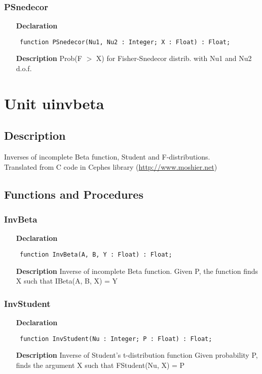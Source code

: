 \documentclass[12pt,a4paper,oneside]{report}
\newcommand{\declarationitem}[1]{\textbf{#1}}
\newcommand{\descriptiontitle}[1]{\textbf{#1}}
\newcommand{\code}[1]{\texttt{#1}}
\begin{document}
\subsubsection{PSnedecor}
\label{uibtdist-PSnedecor}
\begin{itemize}\item[\declarationitem{Declaration}\hfill]
	\begin{flushleft}
		\code{
			function PSnedecor(Nu1, Nu2 : Integer; X : Float) : Float;}
	\end{flushleft}
	\item[\descriptiontitle{Description}]
	Prob(F {$>$} X) for Fisher{-}Snedecor distrib. with Nu1 and Nu2 d.o.f.
\end{itemize}

\section{Unit uinvbeta}
\label{uinvbeta}
\subsection{Description}
Inverses of incomplete Beta function, Student and F{-}distributions.\\
Translated from C code in Cephes library (\href{http://www.moshier.net}{http://www.moshier.net}) \subsection{Functions and Procedures}
\subsubsection{InvBeta}
\label{uinvbeta-InvBeta}
\begin{itemize}\item[\declarationitem{Declaration}\hfill]
	\begin{flushleft}
		\code{
			function InvBeta(A, B, Y : Float) : Float;}
	\end{flushleft}
	\par
	\item[\descriptiontitle{Description}]
	Inverse of incomplete Beta function. Given P, the function finds X such that IBeta(A, B, X) = Y
\end{itemize}
\subsubsection{InvStudent}
\label{uinvbeta-InvStudent}
\begin{itemize}\item[\declarationitem{Declaration}\hfill]
	\begin{flushleft}
		\code{
			function InvStudent(Nu : Integer; P : Float) : Float;}
	\end{flushleft}
	\item[\descriptiontitle{Description}]
	Inverse of Student's t{-}distribution function Given probability P, finds the argument X such that FStudent(Nu, X) = P
\end{itemize}
\end{document}
